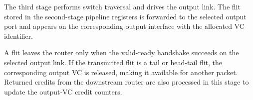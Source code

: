 The third stage performs switch traversal and drives the output link. The flit stored in the second-stage pipeline registers is forwarded to the selected output port and appears on the corresponding output interface with the allocated VC identifier.

A flit leaves the router only when the valid-ready handshake succeeds on the selected output link. If the transmitted flit is a tail or head-tail flit, the corresponding output VC is released, making it available for another packet. Returned credits from the downstream router are also processed in this stage to update the output-VC credit counters.